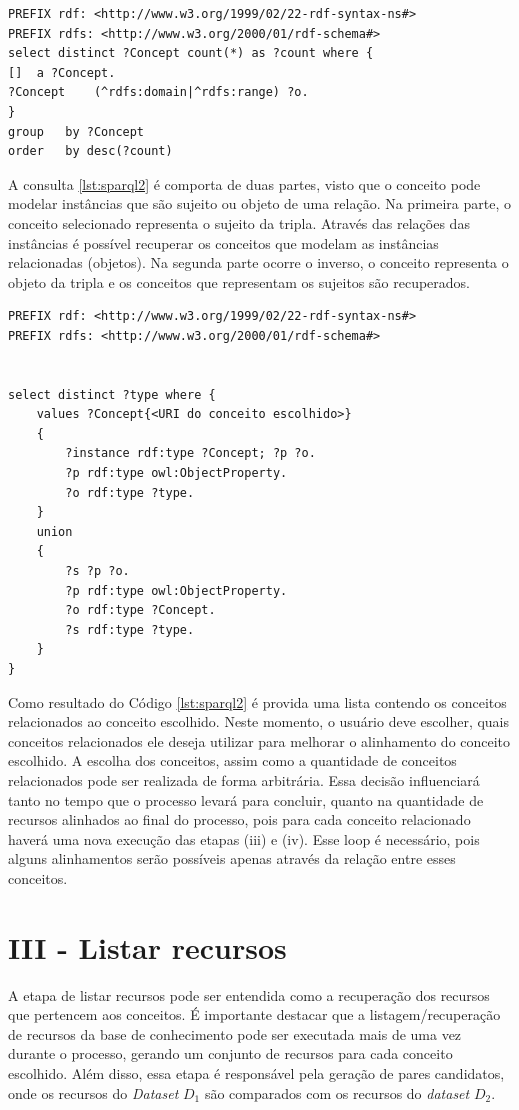 \begin{lstlisting}[captionpos=b, caption= Consulta SPARQL para identificação de conceito, label=lst:sparql,
basicstyle=\ttfamily,frame=single]
PREFIX rdf: <http://www.w3.org/1999/02/22-rdf-syntax-ns#>
PREFIX rdfs: <http://www.w3.org/2000/01/rdf-schema#>
select distinct ?Concept count(*) as ?count where {
[] 	a ?Concept.
?Concept 	(^rdfs:domain|^rdfs:range) ?o.
}
group 	by ?Concept	
order 	by desc(?count)
\end{lstlisting}

A consulta \ref{lst:sparql2} é comporta de duas partes, visto que o conceito pode modelar instâncias que são sujeito ou objeto de uma relação. Na primeira parte, o conceito selecionado representa o sujeito da tripla. Através das relações das instâncias é possível recuperar os conceitos que modelam as instâncias  relacionadas (objetos). Na segunda parte ocorre o inverso, o conceito representa o objeto da tripla e os conceitos que representam os sujeitos são recuperados.

\begin{lstlisting}[captionpos=b, caption=Query SPARQL para recuperação de conceitos relacionados, label=lst:sparql2,
   basicstyle=\ttfamily,frame=single]
PREFIX rdf: <http://www.w3.org/1999/02/22-rdf-syntax-ns#>
PREFIX rdfs: <http://www.w3.org/2000/01/rdf-schema#>


select distinct ?type where {
	values ?Concept{<URI do conceito escolhido>}
	{
		?instance rdf:type ?Concept; ?p ?o.
		?p rdf:type owl:ObjectProperty.
		?o rdf:type ?type.
	}
	union
	{
		?s ?p ?o.
		?p rdf:type owl:ObjectProperty.
		?o rdf:type ?Concept.
		?s rdf:type ?type.
	}
}

\end{lstlisting}

Como resultado do Código \ref{lst:sparql2} é provida uma lista contendo os conceitos relacionados ao conceito escolhido. Neste momento, o usuário deve escolher, quais conceitos relacionados ele deseja utilizar para melhorar o alinhamento do conceito escolhido. A escolha dos conceitos, assim como a quantidade de conceitos relacionados pode ser realizada de forma arbitrária. Essa decisão influenciará tanto no tempo que o processo levará para concluir, quanto na quantidade de recursos alinhados ao final do processo, pois para cada conceito relacionado haverá uma nova execução das etapas (iii) e (iv). Esse loop é necessário, pois alguns alinhamentos serão possíveis apenas através da relação entre esses conceitos.

\section{III - Listar recursos}
A etapa de listar recursos pode ser entendida como a recuperação dos recursos que pertencem aos conceitos. É importante destacar que a listagem/recuperação de recursos da base de conhecimento pode ser executada mais de uma vez durante o processo, gerando um conjunto de recursos para cada conceito escolhido. Além disso, essa etapa é responsável pela geração de pares candidatos, onde os recursos do \textit{Dataset} $D_{1}$ são comparados com os recursos do \textit{dataset} $D_{2}$.



